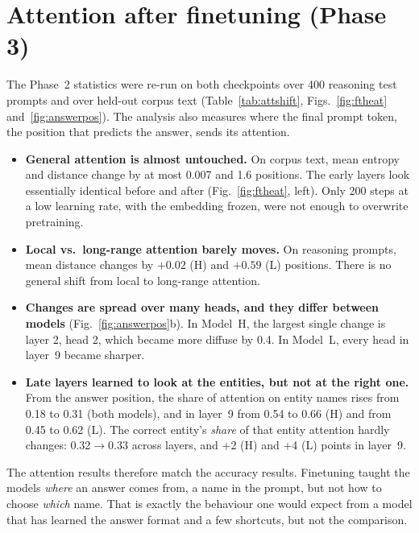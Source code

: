 \documentclass[10pt,a4paper]{article}
\newcommand{\MH}{Model~H}
\newcommand{\ML}{Model~L}
\newcommand{\tablefile}[1]{}
\begin{document}
\section{Attention after finetuning (Phase 3)}
The Phase~2 statistics were re-run on both checkpoints over 400 reasoning test prompts and over held-out corpus text (Table~\ref{tab:attshift}, Figs.~\ref{fig:ftheat} and~\ref{fig:answerpos}). The analysis also measures where the final prompt token, the position that predicts the answer, sends its attention.
\begin{itemize}
\item \textbf{General attention is almost untouched.} On corpus text, mean entropy and distance change by at most 0.007 and 1.6 positions. The early layers look essentially identical before and after (Fig.~\ref{fig:ftheat}, left). Only 200 steps at a low learning rate, with the embedding frozen, were not enough to overwrite pretraining.
\item \textbf{Local vs.\ long-range attention barely moves.} On reasoning prompts, mean distance changes by $+0.02$ (H) and $+0.59$ (L) positions. There is no general shift from local to long-range attention.
\item \textbf{Changes are spread over many heads, and they differ between models} (Fig.~\ref{fig:answerpos}b). In \MH{}, the largest single change is layer 2, head 2, which became more diffuse by 0.4. In \ML{}, every head in layer~9 became sharper.
\item \textbf{Late layers learned to look at the entities, but not at the right one.} From the answer position, the share of attention on entity names rises from 0.18 to 0.31 (both models), and in layer~9 from 0.54 to 0.66 (H) and from 0.45 to 0.62 (L). The correct entity's \emph{share} of that entity attention hardly changes: 0.32$\to$0.33 across layers, and +2 (H) and +4 (L) points in layer~9.
\end{itemize}
The attention results therefore match the accuracy results. Finetuning taught the models \emph{where} an answer comes from, a name in the prompt, but not how to choose \emph{which} name. That is exactly the behaviour one would expect from a model that has learned the answer format and a few shortcuts, but not the comparison.

\begin{table}[t]
\centering\small
\tablefile{attention_shift}
\caption{Attention before and after finetuning, averaged over heads. Entropy is normalised and distance is in tokens. \emph{Answer pos.\ $\to$ entities} is the attention mass from the final prompt token onto entity-name tokens. \emph{Gold share} is the correct entity's fraction of that mass.}
\label{tab:attshift}
\end{table}
\end{document}

